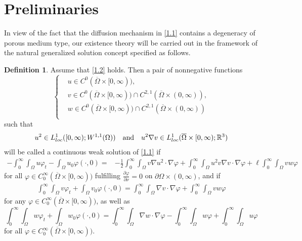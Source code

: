 \documentclass[12pt]{article}
\theoremstyle{plain}
\theoremstyle{definition}
\newtheorem{definition}{Definition}[section]
\numberwithin{equation}{section}
\begin{document}
\section{Preliminaries}
In view of the fact that the diffusion mechanism in \eqref{1.1} contains a degeneracy of porous medium type, our existence theory will be carried out in the framework of the natural generalized solution concept specified as follows.
\begin{definition}\label{Definition 2.1} Assume  that \eqref{1.2} holds. Then a pair of nonnegative functions
\begin{equation*}
\left\{
\begin{aligned}
&u\in C^{0}(\overline{\Omega}\times [0,\infty)), \\
&v\in C^{0}(\overline{\Omega}\times [0,\infty))\cap C^{2,1}(\overline{\Omega}\times(0,\infty)),\\
&w\in C^{0}(\overline{\Omega}\times [0,\infty))\cap C^{2,1}(\overline{\Omega}\times(0,\infty))\\
\end{aligned}
\right.
\end{equation*}
such that
\begin{align}\label{2.1}
  u^2 \in L^{1}_{loc}([0,\infty); W^{1,1}(\Omega))\quad \hbox{and}\quad u^2\nabla v \in L^{1}_{loc}(\overline{\Omega}\times
  [0,\infty);\mathbb{R}^3)
\end{align}
 will be called a continuous weak solution of \eqref{1.1} if
\begin{align}\label{2.2}
    -\int_{0}^{\infty}\!\int_{\Omega}u\varphi_t-\int_{\Omega}u_0\varphi(\cdot,0)=
    &-\frac{1}{2}\int_{0}^{\infty} \!\int_{\Omega}
     v \nabla u^2 \cdot\nabla\varphi %
     +\int_{0}^{\infty}\!\int_{\Omega}u^{2}v\nabla v\cdot \nabla \varphi
     +\ell\int_{0}^{\infty}\!\int_{\Omega}vw\varphi
\end{align}
for all
 $\varphi \in C_0^{\infty}(\overline{\Omega}\times [0,\infty))$
 fulfilling $\frac{\partial \varphi}{\partial \nu}=0$ on $\partial\Omega\times(0,\infty)$, and if
\begin{align}\label{2.3}
\int_{0}^{\infty}\int_{\Omega}v\varphi_t+\int_{\Omega}v_0\varphi(\cdot,0)=\int_{0}^{\infty}\int_{\Omega}\nabla
v\cdot\nabla\varphi+\int_{0}^{\infty}\int_{\Omega}vw\varphi
\end{align}
for any $\varphi \in C_0^{\infty}(\overline{\Omega}\times [0,\infty))$, as well as
\begin{equation}\label{2.4}
    \int_{0}^{\infty}\int_{\Omega}w\varphi_t+\int_{\Omega}w_0\varphi(\cdot,0)=\int_{0}^{\infty}\int_{\Omega}\nabla
w\cdot\nabla\varphi-\int_{0}^{\infty}\int_{\Omega}w\varphi+\int_{0}^{\infty}\int_{\Omega}u\varphi
\end{equation}
for all $\varphi\in C_0^{\infty}(\overline{\Omega}\times[0,\infty))$.
\end{definition}
\end{document}

